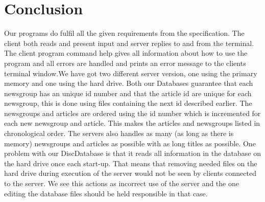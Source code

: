 \documentclass[a4paper]{article}
\begin{document}
\section{Conclusion}            %
Our programs do fulfil all the given requirements from the specification. The client both reads and present input and server replies to and from the terminal. The client program command help gives all information about how to use the program and all errors are handled and prints an error message to the clients terminal window.\newline \newline We have got two different server version, one using the primary memory and one using the hard drive. Both our Databases guarantee that each newsgroup has an unique id number and that the article id are unique for each newsgroup, this is done using files containing the next id described earlier. The newsgroups and articles are ordered using the id number which is incremented for each new newsgroup and article. This makes the articles and newsgroups listed in chronological order. The servers also handles as many (as long as there is memory) newsgroups and articles as possible with as long titles as possible. 
\newline \newline
One problem with our DiscDatabase is that it reads all information in the database on the hard drive once each start-up. That means that removing needed files on the hard drive during execution of the server would not be seen by clients connected to the server. We see this actions as incorrect use of the server and the one editing the database files should be held responsible in that case.

\newpage
\end{document}
